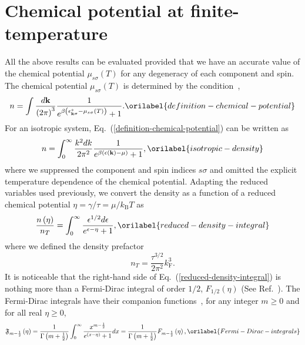 \documentclass[aps,showkeys,noshowpacs,superscriptaddress,pre,preprint]{revtex4-2}
\let\label\orilabel
\begin{document}
\section{Chemical potential at finite-temperature}
\label{sec:chemical-potential}

All the above results can be evaluated provided that 
we have an accurate value of the chemical potential ${\mu_{s\sigma} (T)}$ for any degeneracy
of each component and spin.
The chemical potential ${\mu_{s\sigma} (T)}$ is determined by the condition~\cite{Ashcroft-Mermin1976},
\begin{equation}
n = \int \frac{d\mathbf{k}}{\left( 2\pi \right)^3 }
\frac{1}{e^{ \beta \left( \epsilon^s_{\mathbf{k}\sigma} - {\mu_{s\sigma} (T) } \right) } +1} .
\label{definition-chemical-potential}
\end{equation}
For an isotropic system, Eq.~(\ref{definition-chemical-potential}) can be written as
\begin{equation}
n = \int_0^\infty \frac{k^2 dk}{2 \pi^2} 
\frac{1}{e^{ \beta \left( {\epsilon \left( \mathbf{k} \right)} - \mu \right) } +1} ,
\label{isotropic-density}
\end{equation}
where we suppressed the component and spin indices $s\sigma$ 
and omitted the explicit temperature dependence of the chemical potential.
Adapting the reduced variables used previously, 
we convert the density as a function of 
a reduced chemical potential $\eta = \gamma / \tau = \mu / k_\mathrm{B} T$ as
\begin{equation}
\frac{n \left( \eta \right)}{n_T} = \int_0^\infty \frac{\epsilon^{1/2} d\epsilon}{e^{\epsilon - \eta} +1} ,
\label{reduced-density-integral}
\end{equation}
where we defined the density prefactor
\begin{equation*}
n_T = \frac{\tau^{3/2}}{2 \pi^2} k_\mathrm{F}^3 .
\end{equation*}
It is noticeable that the right-hand side of Eq.~(\ref{reduced-density-integral}) is nothing more than
a Fermi-Dirac integral of order $1/2$, $F_{1/2} \left( \eta \right)$ (See Ref.~).
The Fermi-Dirac integrals have their companion functions~\cite{Dingle1957},
for any integer $m \ge 0$ and for all real $\eta \ge 0$,
\begin{equation}
\mathfrak{F}_{m- \frac{1}{2}} \left( \eta \right) = 
\frac{1}{\Gamma \left( m + \frac{1}{2} \right)} 
\int_0^\infty \frac{x^{m-\frac{1}{2}}}{e^{\left( x - \eta \right)} + 1} dx
= \frac{1}{\Gamma \left( m + \frac{1}{2} \right)} F_{m - \frac{1}{2}} \left( \eta \right) ,
\label{Fermi-Dirac-integrals}
\end{equation}
\end{document}
